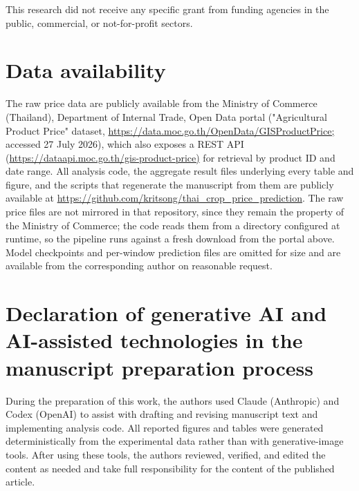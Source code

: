 \documentclass[review,3p,times]{elsarticle}
\begin{document}
This research did not receive any specific grant from funding agencies in the public, commercial, or not-for-profit sectors.

\section*{Data availability}

The raw price data are publicly available from the Ministry of Commerce (Thailand), Department of Internal Trade, Open Data portal ("Agricultural Product Price" dataset, \url{https://data.moc.go.th/OpenData/GISProductPrice;} accessed 27 July 2026), which also exposes a REST API (\url{https://dataapi.moc.go.th/gis-product-price)} for retrieval by product ID and date range. All analysis code, the aggregate result files underlying every table and figure, and the scripts that regenerate the manuscript from them are publicly available at \url{https://github.com/kritsong/thai_crop_price_prediction}. The raw price files are not mirrored in that repository, since they remain the property of the Ministry of Commerce; the code reads them from a directory configured at runtime, so the pipeline runs against a fresh download from the portal above. Model checkpoints and per-window prediction files are omitted for size and are available from the corresponding author on reasonable request.

\section*{Declaration of generative AI and AI-assisted technologies in the manuscript preparation process}

During the preparation of this work, the authors used Claude (Anthropic) and Codex (OpenAI) to assist with drafting and revising manuscript text and implementing analysis code. All reported figures and tables were generated deterministically from the experimental data rather than with generative-image tools. After using these tools, the authors reviewed, verified, and edited the content as needed and take full responsibility for the content of the published article.
\end{document}
